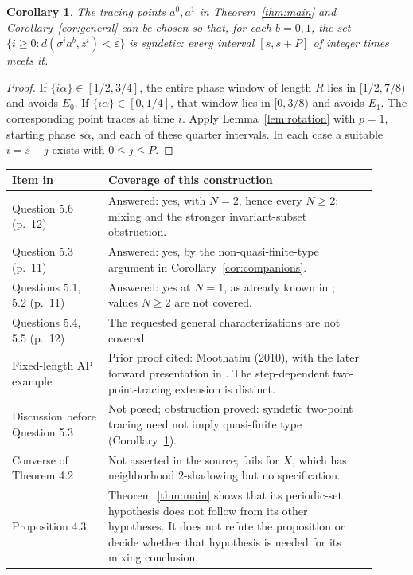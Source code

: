\documentclass[11pt]{article}
\newtheorem{corollary}[theorem]{Corollary}
\begin{document}
\begin{corollary}\label{cor:syndetic}
The tracing points $a^0,a^1$ in Theorem~\ref{thm:main} and
Corollary~\ref{cor:general} can be chosen so that, for each $b=0,1$,
the set $\{i\geq0:d(\sigma^i a^b,z^i)<\varepsilon\}$ is syndetic:
every interval $[s,s+P]$ of integer times meets it.
\end{corollary}
\begin{proof}
If $\{i\alpha\}\in[1/2,3/4]$, the entire phase window of length
$R$ lies in $[1/2,7/8)$ and avoids $E_0$. If
$\{i\alpha\}\in[0,1/4]$, that window lies in $[0,3/8)$ and
avoids $E_1$. The corresponding point traces at time $i$.
Apply Lemma~\ref{lem:rotation} with $p=1$, starting phase $s\alpha$,
and each of these quarter intervals. In each case a suitable
$i=s+j$ exists with $0\leq j\leq P$.
\end{proof}

\begin{center}
\small
\begin{tabular}{@{}p{0.24\linewidth}p{0.67\linewidth}@{}}
\toprule
Item in \cite{MS} & Coverage of this construction\\
\midrule
Question 5.6 (p.~12) & Answered: yes, with $N=2$, hence every $N\geq2$;
mixing and the stronger invariant-subset obstruction.\\
Question 5.3 (p.~11) & Answered: yes, by the non-quasi-finite-type
argument in Corollary~\ref{cor:companions}.\\
Questions 5.1, 5.2 (p.~11) & Answered: yes at $N=1$, as already
known in \cite[Section 3]{MS}; values $N\geq2$ are not covered.\\
Questions 5.4, 5.5 (p.~12) & The requested general characterizations are
not covered.\\
Fixed-length AP example & Prior proof cited: Moothathu (2010),
with the later forward presentation in \cite{KLOY}. The
step-dependent two-point-tracing extension is distinct.\\
Discussion before Question 5.3 & Not posed; obstruction proved:
syndetic two-point tracing need not imply quasi-finite type
(Corollary~\ref{cor:syndetic}).\\
Converse of Theorem 4.2 & Not asserted in the source; fails for $X$,
which has neighborhood $2$-shadowing but no specification.\\
Proposition 4.3 & Theorem~\ref{thm:main} shows that its periodic-set
hypothesis does not follow from its other hypotheses. It does not
refute the proposition or decide whether that hypothesis is needed
for its mixing conclusion.\\
\bottomrule
\end{tabular}
\end{center}
\end{document}
